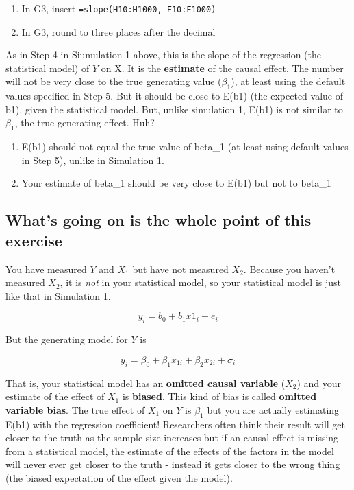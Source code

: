 \documentclass[]{book}
\providecommand{\tightlist}{%
  \setlength{\itemsep}{0pt}\setlength{\parskip}{0pt}}
\begin{document}
\begin{enumerate}
\def\labelenumi{\arabic{enumi}.}
\tightlist
\item
  In G3, insert \texttt{=slope(H10:H1000,\ F10:F1000)}
\item
  In G3, round to three places after the decimal
\end{enumerate}

As in Step 4 in Siumulation 1 above, this is the slope of the regression
(the statistical model) of \(Y\) on X. It is the \textbf{estimate} of
the causal effect. The number will not be very close to the true
generating value (\(\beta_1\)), at least using the default values
specified in Step 5. But it should be close to E(b1) (the expected value
of b1), given the statistical model. But, unlike simulation 1, E(b1) is
not similar to \(\beta_1\), the true generating effect. Huh?

\begin{enumerate}
\def\labelenumi{\arabic{enumi}.}
\tightlist
\item
  E(b1) should not equal the true value of beta\_1 (at least using
  default values in Step 5), unlike in Simulation 1.
\item
  Your estimate of beta\_1 should be very close to E(b1) but not to
  beta\_1
\end{enumerate}

\subsection{What's going on is the whole point of this
exercise}\label{whats-going-on-is-the-whole-point-of-this-exercise}

You have measured \(Y\) and \(X_1\) but have not measured \(X_2\).
Because you haven't measured \(X_2\), it is \emph{not} in your
statistical model, so your statistical model is just like that in
Simulation 1.

\begin{equation}
y_i = b_0 + b_1 x1_i + e_i
\end{equation}

But the generating model for \(Y\) is

\begin{equation}
y_i = \beta_0 + \beta_1 x_{1i} + \beta_2 x_{2i} + \sigma_i
\end{equation}

That is, your statistical model has an \textbf{omitted causal variable}
(\(X_2\)) and your estimate of the effect of \(X_1\) is \textbf{biased}.
This kind of bias is called \textbf{omitted variable bias}. The true
effect of \(X_1\) on \(Y\) is \(\beta_1\) but you are actually
estimating E(b1) with the regression coefficient! Researchers often
think their result will get closer to the truth as the sample size
increases but if an causal effect is missing from a statistical model,
the estimate of the effects of the factors in the model will never ever
get closer to the truth - instead it gets closer to the wrong thing (the
biased expectation of the effect given the model).
\end{document}
